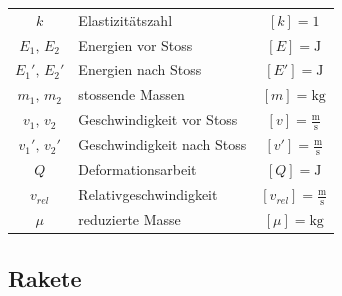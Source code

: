 			\begin{tabular}{c l c}
				$k$ & Elastizitätszahl & $[k] = 1$ \\
				$E_1, \,E_2$ & Energien vor Stoss & $[E] = \mathrm{J}$ \\	
				$E_1 ', \, E_2 '$ & Energien nach Stoss & $[E'] = \mathrm{J}$ \\	
				$m_1, \, m_2$ & stossende Massen & $[m] = \mathrm{kg}$ \\
				$v_1, \, v_2$ & Geschwindigkeit vor Stoss & $[v] = \mathrm{\frac{m}{s}}$ \\
				$v_1', \, v_2'$ & Geschwindigkeit nach Stoss & $[v'] = \mathrm{\frac{m}{s}}$ \\
				$Q$ & Deformationsarbeit & $[Q] = \mathrm{J}$ \\
				$v_{rel}$ & Relativgeschwindigkeit &  $[v_{rel}] = \mathrm{\frac{m}{s}}$ \\
				$\mu$ & reduzierte Masse & $[\mu] = \mathrm{kg}$ \\
			\end{tabular}

	\subsection{Rakete}
